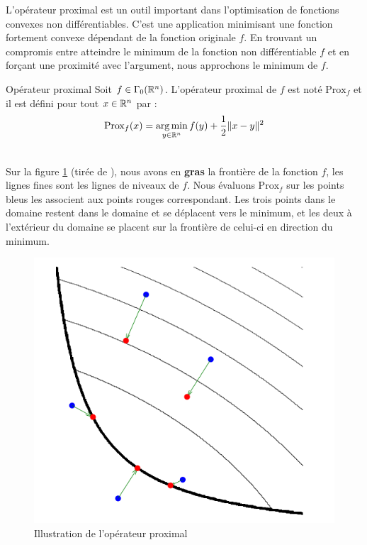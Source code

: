 \documentclass[a4paper,12pt]{article}
\newcommand{\prox}{\text{Prox}}
\begin{document}
L'opérateur proximal est un outil important dans l'optimisation de fonctions convexes non différentiables. C'est une application minimisant une fonction fortement convexe dépendant de la fonction originale $f$. En trouvant un compromis entre atteindre le minimum de la fonction non différentiable $f$ et en forçant une proximité avec l'argument, nous approchons le minimum de $f$. 

\begin{definition}{Opérateur proximal}
Soit $f\in\Gamma_0(\mathbb{R}^n)$. L'opérateur proximal de $f$ est noté $\prox_f$ et il est défini pour tout $x\in\mathbb{R}^n$ par : 
$$
\prox_f(x) = \argmin_{y\in\RR^n} f(y) +\frac{1}{2}\|x-y\|^2
$$
\end{definition}
\\
Sur la figure \ref{fig:proximal} (tirée de \cite{parikh2014proximal}), nous avons en \textbf{gras} la frontière de la fonction $f$, les lignes fines sont les lignes de niveaux de $f$. Nous évaluons $\prox_f$ sur les points bleus les associent aux points rouges correspondant. Les trois points dans le domaine restent dans le domaine et se déplacent vers le minimum, et les deux à l'extérieur du domaine se placent sur la frontière de celui-ci en direction du minimum. 
\begin{figure}[!h]
\centering
\includegraphics[scale=0.7]{img/proximal.png}
\caption{\label{fig:proximal}Illustration de l'opérateur proximal}
\end{figure}
\end{document}
